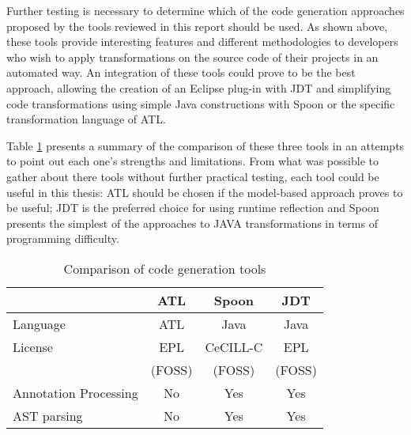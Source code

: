 Further testing is necessary to determine which of the code generation approaches proposed by the tools reviewed in this report should be used. As shown above, these tools provide interesting features and different methodologies to developers who wish to apply transformations on the source code of their projects in an automated way. An integration of these tools could prove to be the best approach, allowing the creation of an Eclipse plug-in with JDT and simplifying code transformations using simple Java constructions with Spoon or the specific transformation language of ATL.

Table \ref{tab:codetools} presents a summary of the comparison of these three tools in an attempts to point out each one's strengths and limitations. From what was possible to gather about there tools without further practical testing, each tool could be useful in this thesis: ATL should be chosen if the model-based approach proves to be useful; JDT is the preferred choice for using runtime reflection and Spoon presents the simplest of the approaches to JAVA transformations in terms of programming difficulty.

\begin{table}[h]
	\caption{Comparison of code generation tools}
	\label{tab:codetools}
	\begin{center}
		\begin{tabular}{l|ccc}
		\hline

		\hline
		\textbf{} & \textbf{ATL} & \textbf{Spoon} & \textbf{JDT} \\
		\hline
			Language & ATL 		& Java 		& Java \\
		\hline
			License & EPL 		& CeCILL-C 	& EPL \\
					& (FOSS) 	& (FOSS)	& (FOSS) \\
		\hline
			Annotation Processing & No & Yes & Yes \\
		\hline
			AST parsing & No & Yes & Yes \\
		\hline
		\end{tabular}
	\end{center}
\end{table}



